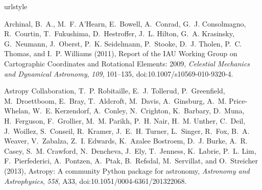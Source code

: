 \DIFdelend %


\DIFdelbegin %
\DIFdelend \DIFaddbegin \begin{thebibliography}{22}
\DIFaddend \providecommand{\natexlab}[1]{#1}
\expandafter\ifx\csname urlstyle\endcsname\relax
  \providecommand{\doi}[1]{doi:\discretionary{}{}{}#1}\else
  \providecommand{\doi}{doi:\discretionary{}{}{}\begingroup
  \urlstyle{rm}\Url}\fi

{Archinal}, B.~A., M.~F. {A'Hearn}, E.~{Bowell}, A.~{Conrad}, G.~J.
  {Consolmagno}, R.~{Courtin}, T.~{Fukushima}, D.~{Hestroffer}, J.~L. {Hilton},
  G.~A. {Krasinsky}, G.~{Neumann}, J.~{Oberst}, P.~K. {Seidelmann},
  P.~{Stooke}, D.~J. {Tholen}, P.~C. {Thomas}, and I.~P. {Williams} (2011),
  {Report of the IAU Working Group on Cartographic Coordinates and Rotational
  Elements: 2009}, \textit{Celestial Mechanics and Dynamical Astronomy},
  \textit{109}, 101--135, \doi{10.1007/s10569-010-9320-4}.

{Astropy Collaboration}, T.~P. {Robitaille}, E.~J. {Tollerud}, P.~{Greenfield},
  M.~{Droettboom}, E.~{Bray}, T.~{Aldcroft}, M.~{Davis}, A.~{Ginsburg}, A.~M.
  {Price-Whelan}, W.~E. {Kerzendorf}, A.~{Conley}, N.~{Crighton}, K.~{Barbary},
  D.~{Muna}, H.~{Ferguson}, F.~{Grollier}, M.~M. {Parikh}, P.~H. {Nair}, H.~M.
  {Unther}, C.~{Deil}, J.~{Woillez}, S.~{Conseil}, R.~{Kramer}, J.~E.~H.
  {Turner}, L.~{Singer}, R.~{Fox}, B.~A. {Weaver}, V.~{Zabalza}, Z.~I.
  {Edwards}, K.~{Azalee Bostroem}, D.~J. {Burke}, A.~R. {Casey}, S.~M.
  {Crawford}, N.~{Dencheva}, J.~{Ely}, T.~{Jenness}, K.~{Labrie}, P.~L. {Lim},
  F.~{Pierfederici}, A.~{Pontzen}, A.~{Ptak}, B.~{Refsdal}, M.~{Servillat}, and
  O.~{Streicher} (2013), {Astropy: A community Python package for astronomy},
  \textit{Astronomy and Astrophysics}, \textit{558}, A33,
  \doi{10.1051/0004-6361/201322068}.


\end{thebibliography}
